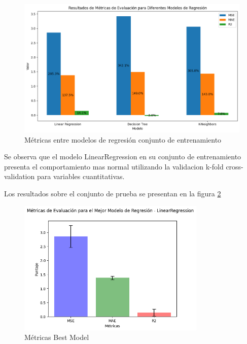 \begin{figure}[H]
    \centering
    \includegraphics[width=1\textwidth]{img/compara_algoritmos/metricasEntreModelosRegresion.png}
    \caption{Métricas entre modelos de regresión conjunto de entrenamiento}
    \label{fig:metricas_regresion}
\end{figure}

Se observa que el modelo LinearRegression en su conjunto de entrenamiento presenta el comportamiento mas normal utilizando la validacion k-fold cross-validation para variables cuantitativas.

Los resultados sobre el conjunto de prueba se presentan en la figura \ref{fig:metricas_regresion_bestModel}

\begin{figure}[H]
    \centering
    \includegraphics[width=0.8\textwidth]{img/compara_algoritmos/metricasBestModelLinearRegression.png}
    \caption{Métricas Best Model}
    \label{fig:metricas_regresion_bestModel}
\end{figure}

